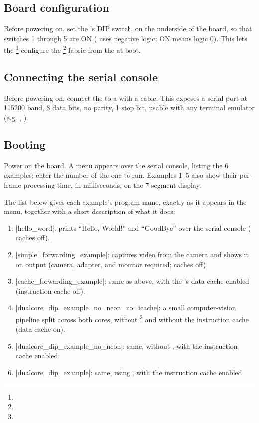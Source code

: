 \subsection{Board configuration}

Before powering on, set the 's  DIP switch, on the underside of the board, so that switches 1 through 5 are ON ( uses negative logic: ON means logic 0). This lets the \footnote{} configure the \footnote{} fabric from the  at boot.

\subsection{Connecting the serial console}

Before powering on, connect the  to a  with a  cable. This exposes a serial port at 115200 baud, 8 data bits, no parity, 1 stop bit, usable with any terminal emulator (e.g. , ).

\subsection{Booting}

Power on the board. A menu appears over the serial console, listing the 6 examples; enter the number of the one to run. Examples 1--5 also show their per-frame processing time, in milliseconds, on the 7-segment display.

The list below gives each example's program name, exactly as it appears in the menu, together with a short description of what it does:

\begin{enumerate}
    \item |hello_word|: prints ``Hello, World!'' and ``GoodBye'' over the serial console ( caches off).
    \item |simple_forwarding_example|: captures video from the camera and shows it on  output (camera, adapter, and  monitor required;  caches off).
    \item |cache_forwarding_example|: same as above, with the 's data cache enabled (instruction cache off).
    \item |dualcore_dip_example_no_neon_no_icache|: a small computer-vision pipeline split across both  cores, without \footnote{} and without the instruction cache (data cache on).
    \item |dualcore_dip_example_no_neon|: same, without , with the instruction cache enabled.
    \item |dualcore_dip_example|: same, using , with the instruction cache enabled.
\end{enumerate}

